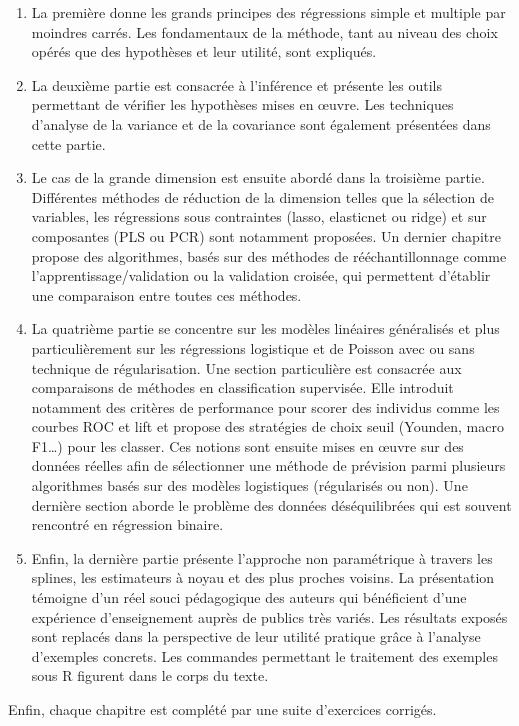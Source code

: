 \documentclass[
  letterpaper,
  DIV=11,
  numbers=noendperiod]{scrartcl}
\begin{document}
\begin{enumerate}
\def\labelenumi{\arabic{enumi}.}
\item
  La première donne les grands principes des régressions simple et
  multiple par moindres carrés. Les fondamentaux de la méthode, tant au
  niveau des choix opérés que des hypothèses et leur utilité, sont
  expliqués.
\item
  La deuxième partie est consacrée à l'inférence et présente les outils
  permettant de vérifier les hypothèses mises en œuvre. Les techniques
  d'analyse de la variance et de la covariance sont également présentées
  dans cette partie.
\item
  Le cas de la grande dimension est ensuite abordé dans la troisième
  partie. Différentes méthodes de réduction de la dimension telles que
  la sélection de variables, les régressions sous contraintes (lasso,
  elasticnet ou ridge) et sur composantes (PLS ou PCR) sont notamment
  proposées. Un dernier chapitre propose des algorithmes, basés sur des
  méthodes de rééchantillonnage comme l'apprentissage/validation ou la
  validation croisée, qui permettent d'établir une comparaison entre
  toutes ces méthodes.
\item
  La quatrième partie se concentre sur les modèles linéaires généralisés
  et plus particulièrement sur les régressions logistique et de Poisson
  avec ou sans technique de régularisation. Une section particulière est
  consacrée aux comparaisons de méthodes en classification supervisée.
  Elle introduit notamment des critères de performance pour scorer des
  individus comme les courbes ROC et lift et propose des stratégies de
  choix seuil (Younden, macro F1\ldots) pour les classer. Ces notions
  sont ensuite mises en œuvre sur des données réelles afin de
  sélectionner une méthode de prévision parmi plusieurs algorithmes
  basés sur des modèles logistiques (régularisés ou non). Une dernière
  section aborde le problème des données déséquilibrées qui est souvent
  rencontré en régression binaire.
\item
  Enfin, la dernière partie présente l'approche non paramétrique à
  travers les splines, les estimateurs à noyau et des plus proches
  voisins. La présentation témoigne d'un réel souci pédagogique des
  auteurs qui bénéficient d'une expérience d'enseignement auprès de
  publics très variés. Les résultats exposés sont replacés dans la
  perspective de leur utilité pratique grâce à l'analyse d'exemples
  concrets. Les commandes permettant le traitement des exemples sous R
  figurent dans le corps du texte.
\end{enumerate}

Enfin, chaque chapitre est complété par une suite d'exercices corrigés.
\end{document}
